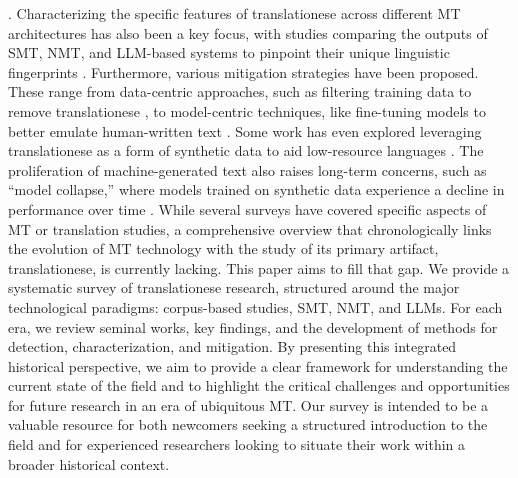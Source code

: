 \cite{pylypenko2021comparing,amponsah2022explaining}. Characterizing the specific features of translationese across different MT architectures has also been a key focus, with studies comparing the outputs of SMT, NMT, and LLM-based systems to pinpoint their unique linguistic fingerprints \cite{riley2020translationese,zhou2024comparison}. Furthermore, various mitigation strategies have been proposed. These range from data-centric approaches, such as filtering training data to remove translationese \cite{lembersky2013improving}, to model-centric techniques, like fine-tuning models to better emulate human-written text \cite{jourdan2025translationese}. Some work has even explored leveraging translationese as a form of synthetic data to aid low-resource languages \cite{dabre2024pretraining}. The proliferation of machine-generated text also raises long-term concerns, such as ``model collapse,'' where models trained on synthetic data experience a decline in performance over time \cite{shumailov2024ai}. While several surveys have covered specific aspects of MT or translation studies, a comprehensive overview that chronologically links the evolution of MT technology with the study of its primary artifact, translationese, is currently lacking. This paper aims to fill that gap. We provide a systematic survey of translationese research, structured around the major technological paradigms: corpus-based studies, SMT, NMT, and LLMs. For each era, we review seminal works, key findings, and the development of methods for detection, characterization, and mitigation. By presenting this integrated historical perspective, we aim to provide a clear framework for understanding the current state of the field and to highlight the critical challenges and opportunities for future research in an era of ubiquitous MT. Our survey is intended to be a valuable resource for both newcomers seeking a structured introduction to the field and for experienced researchers looking to situate their work within a broader historical context. 